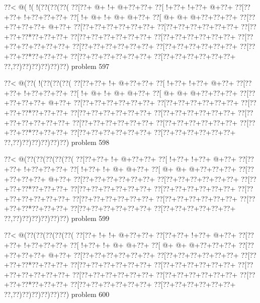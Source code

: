\vbox{\vbox{\goo
\0??<\- @(\- !(\- !(\0??(\0??(\0??(
\0??[\0??+\- @+\- !+\- @+\0??+\0??+
\0??[\- !+\0??+\- !+\0??+\- @+\0??+
\0??[\0??+\0??+\- !+\0??+\0??+\0??+
\0??[\- !+\- @+\- !+\- @+\- @+\0??+
\0??[\- @+\- @+\- @+\0??+\0??+\0??+
\0??[\0??+\0??+\0??+\0??+\- @+\0??+
\0??[\0??+\0??+\0??+\0??+\0??+\0??+
\0??[\0??+\0??+\0??+\0??+\0??+\0??+
\0??[\0??+\0??+\0??*\0??+\0??+\0??+
\0??[\0??+\0??+\0??+\0??+\0??+\0??+
\0??[\0??+\0??+\0??+\0??+\0??+\0??+
\0??[\0??+\0??+\0??+\0??+\0??+\0??+
\0??[\0??+\0??+\0??+\0??+\0??+\0??+
\0??[\0??+\0??+\0??+\0??+\0??+\0??+
\0??[\0??+\0??+\0??*\0??+\0??+\0??+
\0??[\0??+\0??+\0??+\0??+\0??+\0??+
\0??[\0??+\0??+\0??+\0??+\0??+\0??+
\0??,\0??)\0??)\0??)\0??)\0??)\0??)
}
\hfil problem 597\hfil\break
}

\vbox{\vbox{\goo
\0??<\- @(\0??(\- !(\0??(\0??(\0??(
\0??[\0??+\0??+\- !+\- @+\0??+\0??+
\0??[\- !+\0??+\- !+\0??+\- @+\0??+
\0??[\0??+\0??+\- !+\0??+\0??+\0??+
\0??[\- !+\- @+\- !+\- @+\- @+\0??+
\0??[\- @+\- @+\- @+\0??+\0??+\0??+
\0??[\0??+\0??+\0??+\0??+\- @+\0??+
\0??[\0??+\0??+\0??+\0??+\0??+\0??+
\0??[\0??+\0??+\0??+\0??+\0??+\0??+
\0??[\0??+\0??+\0??*\0??+\0??+\0??+
\0??[\0??+\0??+\0??+\0??+\0??+\0??+
\0??[\0??+\0??+\0??+\0??+\0??+\0??+
\0??[\0??+\0??+\0??+\0??+\0??+\0??+
\0??[\0??+\0??+\0??+\0??+\0??+\0??+
\0??[\0??+\0??+\0??+\0??+\0??+\0??+
\0??[\0??+\0??+\0??*\0??+\0??+\0??+
\0??[\0??+\0??+\0??+\0??+\0??+\0??+
\0??[\0??+\0??+\0??+\0??+\0??+\0??+
\0??,\0??)\0??)\0??)\0??)\0??)\0??)
}
\hfil problem 598\hfil\break
}

\vbox{\vbox{\goo
\0??<\- @(\0??(\0??(\0??(\0??(\0??(
\0??[\0??+\0??+\- !+\- @+\0??+\0??+
\0??[\- !+\0??+\- !+\0??+\- @+\0??+
\0??[\0??+\0??+\- !+\0??+\0??+\0??+
\0??[\- !+\0??+\- !+\- @+\- @+\0??+
\0??[\- @+\- @+\- @+\0??+\0??+\0??+
\0??[\0??+\0??+\0??+\0??+\- @+\0??+
\0??[\0??+\0??+\0??+\0??+\0??+\0??+
\0??[\0??+\0??+\0??+\0??+\0??+\0??+
\0??[\0??+\0??+\0??*\0??+\0??+\0??+
\0??[\0??+\0??+\0??+\0??+\0??+\0??+
\0??[\0??+\0??+\0??+\0??+\0??+\0??+
\0??[\0??+\0??+\0??+\0??+\0??+\0??+
\0??[\0??+\0??+\0??+\0??+\0??+\0??+
\0??[\0??+\0??+\0??+\0??+\0??+\0??+
\0??[\0??+\0??+\0??*\0??+\0??+\0??+
\0??[\0??+\0??+\0??+\0??+\0??+\0??+
\0??[\0??+\0??+\0??+\0??+\0??+\0??+
\0??,\0??)\0??)\0??)\0??)\0??)\0??)
}
\hfil problem 599\hfil\break
}

\vbox{\vbox{\goo
\0??<\- @(\0??(\0??(\0??(\0??(\0??(
\0??[\0??+\- !+\- !+\- @+\0??+\0??+
\0??[\0??+\0??+\- !+\0??+\- @+\0??+
\0??[\0??+\0??+\- !+\0??+\0??+\0??+
\0??[\- !+\0??+\- !+\- @+\- @+\0??+
\0??[\- @+\- @+\- @+\0??+\0??+\0??+
\0??[\0??+\0??+\0??+\0??+\- @+\0??+
\0??[\0??+\0??+\0??+\0??+\0??+\0??+
\0??[\0??+\0??+\0??+\0??+\0??+\0??+
\0??[\0??+\0??+\0??*\0??+\0??+\0??+
\0??[\0??+\0??+\0??+\0??+\0??+\0??+
\0??[\0??+\0??+\0??+\0??+\0??+\0??+
\0??[\0??+\0??+\0??+\0??+\0??+\0??+
\0??[\0??+\0??+\0??+\0??+\0??+\0??+
\0??[\0??+\0??+\0??+\0??+\0??+\0??+
\0??[\0??+\0??+\0??*\0??+\0??+\0??+
\0??[\0??+\0??+\0??+\0??+\0??+\0??+
\0??[\0??+\0??+\0??+\0??+\0??+\0??+
\0??,\0??)\0??)\0??)\0??)\0??)\0??)
}
\hfil problem 600\hfil\break
}

